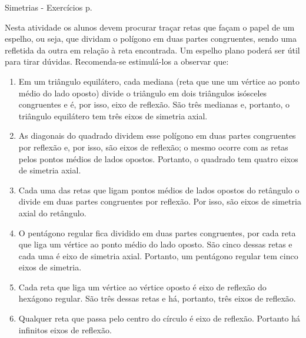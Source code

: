 \begin{sugestions}{Simetrias - Exercícios p. \pageref{transformacoes-exercise4}}
{

Nesta atividade os alunos devem procurar traçar retas que façam o papel de um espelho, ou seja, que dividam o polígono em duas partes congruentes, sendo uma refletida da outra em relação à reta encontrada. Um espelho plano poderá ser útil para tirar dúvidas. Recomenda-se estimulá-los a observar que: 

\begin{enumerate}[label=\textit{\alph*)}, itemsep=2pt]
\item Em um triângulo equilátero, cada mediana (reta que une um vértice ao ponto médio do lado oposto) divide o triângulo em dois triângulos isósceles congruentes e é, por isso, eixo de reflexão. São três medianas e, portanto, o triângulo equilátero tem três eixos de simetria axial. 

\item As diagonais do quadrado dividem esse polígono em duas partes congruentes por reflexão e, por isso, são eixos de reflexão; o mesmo ocorre com as retas pelos pontos médios de lados opostos. Portanto, o quadrado tem quatro eixos de simetria axial.

\item Cada uma das retas que ligam pontos médios de lados opostos do retângulo o divide em duas partes congruentes por reflexão. Por isso, são eixos de simetria axial do retângulo.

\item O pentágono regular fica dividido em duas partes congruentes, por cada reta que liga um vértice ao ponto médio do lado oposto. São cinco dessas retas e cada uma é eixo de simetria axial. Portanto, um pentágono regular tem cinco eixos de simetria.

\item Cada reta que liga um vértice ao vértice oposto é eixo de reflexão do hexágono regular. São três dessas retas e há, portanto, três eixos de reflexão.

\item Qualquer reta que passa pelo centro do círculo é eixo de reflexão. Portanto há infinitos eixos de reflexão.
\end{enumerate}

}
\end{sugestions}
